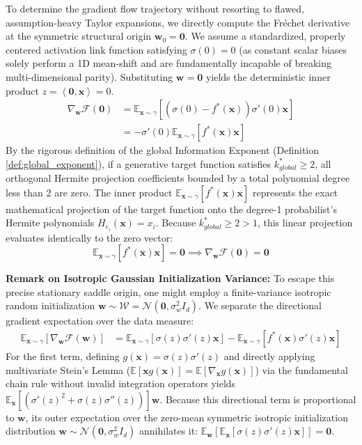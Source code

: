 \documentclass{article}
\newcommand{\E}{\mathbb{E}}
\newcommand{\1}{\mathbb{I}}
\newcommand{\inner}[2]{\left\langle#1, #2\right\rangle}
\newcommand{\calF}{\mathcal{F}}
\newcommand{\calW}{\mathcal{W}}
\newcommand{\bx}{\mathbf{x}}
\newcommand{\bw}{\mathbf{w}}
\newcommand{\calN}{\mathcal{N}}
\begin{document}
To determine the gradient flow trajectory without resorting to flawed, assumption-heavy Taylor expansions, we directly compute the Fréchet derivative at the symmetric structural origin $\bw_0 = \mathbf{0}$. We assume a standardized, properly centered activation link function satisfying $\sigma(0) = 0$ (as constant scalar biases solely perform a 1D mean-shift and are fundamentally incapable of breaking multi-dimensional parity). Substituting $\bw = \mathbf{0}$ yields the deterministic inner product $z = \inner{\mathbf{0}}{\bx} = 0$.
\begin{align} 
    \nabla_\bw \calF(\mathbf{0}) &= \E_{\bx \sim \gamma} \left[ \left( \sigma(0) - f^*(\bx) \right) \sigma'(0) \bx \right] \nonumber \\
    &= -\sigma'(0) \E_{\bx \sim \gamma} \left[ f^*(\bx) \bx \right]
\end{align}
By the rigorous definition of the global Information Exponent (Definition \ref{def:global_exponent}), if a generative target function satisfies $k_{global}^* \ge 2$, all orthogonal Hermite projection coefficients bounded by a total polynomial degree less than 2 are zero. The inner product $\E_{\bx \sim \gamma}[f^*(\bx)\bx]$ represents the exact mathematical projection of the target function onto the degree-1 probabilist's Hermite polynomials $H_{e_i}(\bx) = x_i$. Because $k_{global}^* \ge 2 > 1$, this linear projection evaluates identically to the zero vector:
\begin{equation}
    \E_{\bx \sim \gamma} \left[ f^*(\bx) \bx \right] = \mathbf{0} \implies \nabla_\bw \calF(\mathbf{0}) = \mathbf{0}
\end{equation}

\textbf{Remark on Isotropic Gaussian Initialization Variance:} To escape this precise stationary saddle origin, one might employ a finite-variance isotropic random initialization $\bw \sim \calW = \calN(\mathbf{0}, \sigma_w^2 I_d)$. We separate the directional gradient expectation over the data measure:
\begin{align}
    \E_{\bx \sim \gamma}[ \nabla_\bw \calF(\bw) ] &= \E_{\bx \sim \gamma} \left[ \sigma(z)\sigma'(z)\bx \right] - \E_{\bx \sim \gamma} \left[ f^*(\bx)\sigma'(z)\bx \right]
\end{align}
For the first term, defining $g(\bx) = \sigma(z)\sigma'(z)$ and directly applying multivariate Stein's Lemma ($\E[\bx g(\bx)] = \E[\nabla_\bx g(\bx)]$) via the fundamental chain rule without invalid integration operators yields $\E_{\bx}[ (\sigma'(z)^2 + \sigma(z)\sigma''(z)) ] \bw$. Because this directional term is proportional to $\bw$, its outer expectation over the zero-mean symmetric isotropic initialization distribution $\bw \sim \calN(\mathbf{0}, \sigma_w^2 I_d)$ annihilates it: $\E_{\bw}[\E_{\bx}[\sigma(z)\sigma'(z)\bx]] = \mathbf{0}$.
\end{document}
